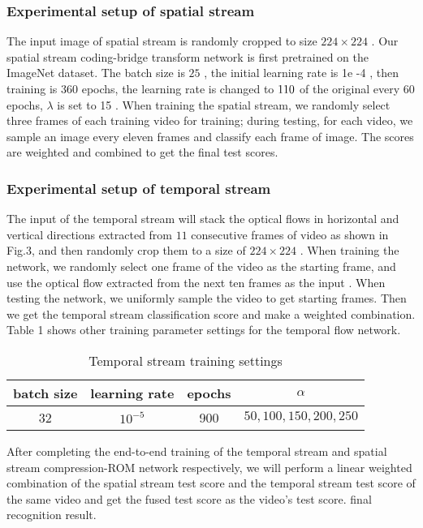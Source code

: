 \documentclass[a4paper]{cas-sc}
\begin{document}
\subsubsection{Experimental setup of spatial stream }
The input image of spatial stream is randomly cropped to size $224\times224$ . 
Our spatial stream coding-bridge transform network is first pretrained on the ImageNet dataset. 
The batch size is $25$ , the initial learning rate is 1e -4 , then training is 360 epochs, 
the learning rate is changed to $1\/10$ of the original every 60 epochs, 
$\lambda$  is set to 15 . 
When training the spatial stream, we randomly select three frames of each training video for training; 
during testing, for each video, we sample an image every eleven frames and classify each frame of image.
The scores are weighted and combined to get the final test scores.\\

\subsubsection{Experimental setup of temporal stream }
The input of the temporal stream will stack the optical flows 
in horizontal and vertical directions extracted from $11$ consecutive frames of video as shown in Fig.3, 
and then randomly crop them to a size of $224\times224$ . 
When training the network, we randomly select one frame of the video as the starting frame, 
and use the optical flow extracted from the next ten frames as the input . 
When testing the network, we uniformly sample the video to get starting frames.
Then we get the temporal stream classification score and make a weighted combination. 
Table 1 shows other training parameter settings for the temporal flow network.\\

\begin{table}[!ht]
  \centering
  \begin{tabular}{cccc}
    \toprule
    batch size & learning rate & epochs & $\alpha$\\
    \midrule
    32 & $10^{-5}$ & 900 & $50,100,150,200,250$ \\
    \bottomrule
  \end{tabular}
  \caption{Temporal stream training settings}\label{tab.1}
\end{table}

After completing the end-to-end training of the temporal stream and spatial stream compression-ROM network respectively, 
we will perform a linear weighted combination of the spatial stream test score and the temporal stream test score of the same video 
and get the fused test score as the video's test score. final recognition result.\\
\end{document}
